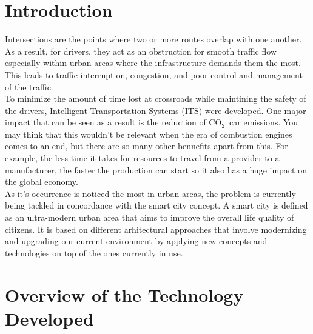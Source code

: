 \documentclass[17pt]{article}
\newcommand{\coo}{\ensuremath{\mathrm{CO_2}}}
\begin{document}
\section{Introduction}
\indent \indent
Intersections are the points where two or more
routes overlap with one another. As a result, for drivers, 
they act as an obstruction for smooth traffic
flow especially within urban areas where the
infrastructure demands them the most. This leads to
traffic interruption, congestion, and poor control and
management of the traffic.\\
\indent \indent
To minimize the amount of time lost at crossroads while
maintining the safety of the drivers, Intelligent
Transportation Systems (ITS) were developed.
One major impact that can be seen as a result is the
reduction of \coo\ car emissions. You may think that
this wouldn't be relevant when the era of combustion
engines comes to an end, but there are so many other
bennefits apart from this. For example, the less time
it takes for resources to travel from a provider to a
manufacturer, the faster the production can start so
it also has a huge impact on the global economy.\\
\indent \indent
As it's occurrence is noticed the most in urban areas,
the problem is currently being tackled in concordance 
with the smart city concept. A smart city is defined as an
ultra-modern urban area that aims to improve the overall life
quality of citizens. It is based on different arhitectural
approaches that involve modernizing and upgrading our current 
environment by applying new concepts and technologies on top
of the ones currently in use.\\

\section{Overview of the Technology Developed}
\end{document}
